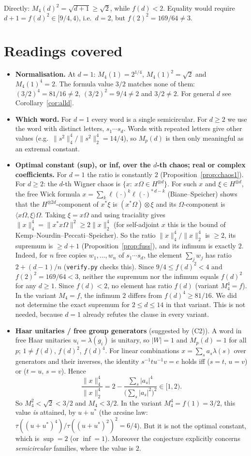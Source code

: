\documentclass[11pt]{article}
\theoremstyle{definition}
\theoremstyle{remark}
\newcommand{\ip}[2]{\langle #1,#2\rangle}
\begin{document}
Directly: $M_4(d)^2=\sqrt{d+1}\ge\sqrt2$, while $f(d)<2$. Equality would require
$d+1=f(d)^2\in[9/4,4)$, i.e.\ $d=2$, but $f(2)^2=169/64\ne3$.

\section{Readings covered}

\begin{itemize}
\item \textbf{Normalisation.} At $d=1$: $M_4(1)=2^{1/4}$, $M_4(1)^2=\sqrt2$ and $M_4(1)^4=2$.
The formula value $3/2$ matches none of them: $(3/2)^4=81/16\ne2$, $(3/2)^2=9/4\ne2$ and
$3/2\ne2$. For general $d$ see Corollary~\ref{cor:alld}.
\item \textbf{Which word.} For $d=1$ every word is a single semicircular. For $d\ge2$ we use the
word with distinct letters, $s_1\cdots s_d$. Words with repeated letters give other values (e.g.\
$\|s^2\|_4^4/\|s^2\|_2^4=14/4$), so $M_p(d)$ is then only meaningful as an extremal constant.
\item \textbf{Optimal constant (sup), or inf, over the $d$-th chaos; real or complex
coefficients.} For $d=1$ the ratio is constantly $2$ (Proposition~\ref{prop:chaos1}). For $d\ge2$:
the $d$-th Wigner chaos is $\{x:\ x\Omega\in H^{\otimes d}\}$. For such $x$ and
$\xi\in H^{\otimes d}$, the free Wick formula
$x=\sum_k\ell(\cdot)^k\ell(\cdot)^{*\,d-k}$ (Biane--Speicher) shows that the
$H^{\otimes 2d}$-component of $x^*\xi$ is $(x^*\Omega)\otimes\xi$ and its $\Omega$-component is
$\ip{x\Omega}{\xi}\Omega$. Taking $\xi=x\Omega$ and using traciality gives
$\|x\|_4^4=\|x^*x\Omega\|^2\ge2\|x\|_2^4$ (for self-adjoint $x$ this is the bound of
Kemp--Nourdin--Peccati--Speicher). So the ratio $\|x\|_4^4/\|x\|_2^4$ is $\ge2$, its supremum is
$\ge d+1$ (Proposition~\ref{prop:fuss}), and its infimum is exactly $2$. Indeed, for $n$ free copies
$w_1,\dots,w_n$ of $s_1\cdots s_d$, the element $\sum_jw_j$ has ratio $2+(d-1)/n$
(\texttt{verify.py} checks this). Since $9/4\le f(d)^2<4$ and $f(2)^2=169/64<3$, neither the
supremum nor the infimum equals $f(d)^2$ for any $d\ge1$. Since $f(d)<2$, no element has
ratio $f(d)$ (variant $M_4^4=f$). In the variant $M_4=f$, the infimum $2$ differs from
$f(d)^4\ge81/16$. We did not determine the exact supremum for $2\le d\le14$ in that variant.
This is not needed, because $d=1$ already refutes the clause in every variant.
\item \textbf{Haar unitaries / free group generators} (suggested by (C2)). A word in free Haar
unitaries $u_i=\lambda(g_i)$ is unitary, so $|W|=1$ and $M_p(d)=1$ for all $p$; $1\ne f(d)$,
$f(d)^2$, $f(d)^4$. For linear combinations $x=\sum_sa_s\lambda(s)$ over generators and their
inverses, the identity $s^{-1}tu^{-1}v=e$ holds iff ($s=t$, $u=v$) or ($t=u$, $s=v$). Hence
\[
\frac{\|x\|_4^4}{\|x\|_2^4}=2-\frac{\sum_s|a_s|^4}{\big(\sum_s|a_s|^2\big)^2}\in[1,2).
\]
So $M_4^2<\sqrt2<3/2$ and $M_4<3/2$. In the variant $M_4^4=f(1)=3/2$, this value \emph{is} attained,
by $u+u^*$ (the arcsine law: $\tau((u+u^*)^4)/\tau((u+u^*)^2)^2=6/4$). But it is not the optimal
constant, which is $\sup=2$ (or $\inf=1$). Moreover the conjecture explicitly concerns
\emph{semicircular} families, where the value is $2$.


\end{itemize}
\end{document}
